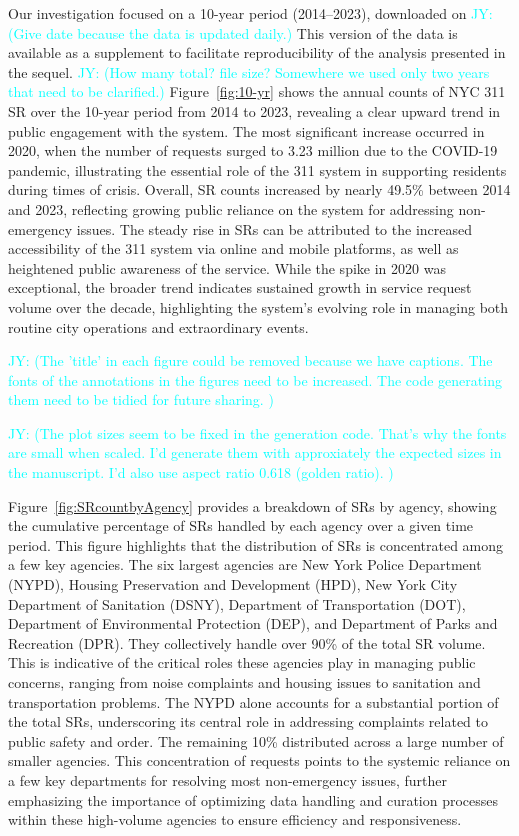\documentclass[linenumber]{jdsart}
\newcommand{\jy}[1]{\textcolor{cyan}{JY: (#1)}}
\begin{document}
Our investigation focused on a 10-year period (2014--2023), downloaded
on \jy{Give date because the data is updated daily.}
This version of the data is available as a supplement to facilitate
reproducibility of the analysis presented in the sequel.
\jy{How many total? file size? Somewhere we used only two years that
  need to be clarified.}
Figure~\ref{fig:10-yr} shows the annual counts of NYC 311 SR over the
10-year period from 2014 to 2023, revealing a clear upward trend in
public engagement with the system. The most significant increase
occurred in 2020, when the number of requests surged to 3.23 million
due to the COVID-19 pandemic, illustrating the essential role of the
311 system in supporting residents during times of crisis. Overall, SR
counts increased by nearly 49.5\% between 2014 and 2023, reflecting
growing public reliance on the system for addressing non-emergency
issues. The steady rise in SRs can be attributed to the increased
accessibility of the 311 system via online and mobile platforms, as
well as heightened public awareness of the service. While the spike in
2020 was exceptional, the broader trend indicates sustained growth in
service request volume over the decade, highlighting the system's
evolving role in managing both routine city operations and
extraordinary events.

\jy{The 'title' in each figure could be removed because we have
  captions. The fonts of the annotations in the figures need to be
  increased. The code generating them need to be tidied for future
  sharing.
}

\jy{The plot sizes seem to be fixed in the generation code. That's why
  the fonts are small when scaled. I'd generate them with approxiately
  the expected sizes in the manuscript. I'd also use aspect ratio
  0.618 (golden ratio).
}

Figure~\ref{fig:SRcountbyAgency} provides a breakdown of SRs by
agency, showing the cumulative percentage of SRs handled by each
agency over a given time period. This figure highlights that the
distribution of SRs is concentrated among a few key agencies. The six
largest agencies are New York Police Department (NYPD), 
Housing Preservation and Development (HPD),
New York City Department of Sanitation (DSNY), Department of
Transportation (DOT), Department of Environmental Protection (DEP),
and Department of Parks and Recreation (DPR).
They collectively handle over 90\% of the total SR volume. This is
indicative of the critical roles these agencies play in managing
public concerns, ranging from noise complaints and housing issues to
sanitation and transportation problems. The NYPD alone accounts for a
substantial portion of the total SRs, underscoring its central role in
addressing complaints related to public safety and order. The
remaining 10\% distributed across a large number of smaller
agencies. This concentration of requests points to the systemic
reliance on a few key departments for resolving most non-emergency
issues, further emphasizing the importance of optimizing data handling
and curation processes within these high-volume agencies to ensure
efficiency and responsiveness.
\end{document}
